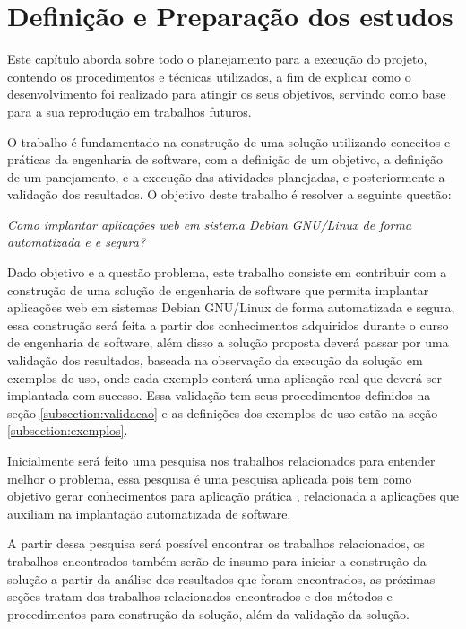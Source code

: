 \chapter{Definição e Preparação dos estudos}

\label{cap-metodologia}
Este capítulo aborda sobre todo o planejamento para a execução do projeto,
contendo os procedimentos e técnicas utilizados, a fim de
explicar como o desenvolvimento foi realizado para atingir os seus objetivos,
servindo como base para a sua reprodução em trabalhos futuros.

O trabalho é fundamentado na construção de uma solução utilizando conceitos e práticas
da engenharia de software, com a definição de um objetivo, a definição de um panejamento,
e a execução das atividades planejadas, e posteriormente a validação dos resultados.
O objetivo deste trabalho é resolver a seguinte questão:

\begin{center}
  \textit{
  Como implantar aplicações web em sistema Debian GNU/Linux de forma automatizada e
  e segura?
}
\end{center}

Dado objetivo e a questão problema, este trabalho consiste em contribuir
com a construção de uma solução de engenharia de software que permita implantar
aplicações web em sistemas Debian GNU/Linux de forma automatizada e segura, essa
construção será feita a partir dos conhecimentos adquiridos durante
o curso de engenharia de software, além disso a solução proposta deverá passar
por uma validação dos resultados, baseada na observação
da execução da solução em exemplos de uso, onde cada exemplo conterá uma aplicação
real que deverá ser implantada com sucesso. Essa validação tem seus procedimentos
definidos na seção \ref{subsection:validacao} e as definições dos exemplos de uso
estão na seção \ref{subsection:exemplos}.

Inicialmente será feito uma pesquisa nos trabalhos relacionados para entender
melhor o problema, essa pesquisa é uma pesquisa aplicada pois tem como objetivo
gerar conhecimentos para aplicação prática \cite{gerhardt2009metodos},
relacionada a aplicações que auxiliam na implantação automatizada de software.

A partir dessa pesquisa será possível encontrar os trabalhos relacionados, os
trabalhos encontrados também serão de insumo para iniciar
a construção da solução a partir da análise dos resultados que foram encontrados,
as próximas seções tratam dos trabalhos relacionados encontrados e dos métodos e
procedimentos para construção da solução, além da validação da solução.

